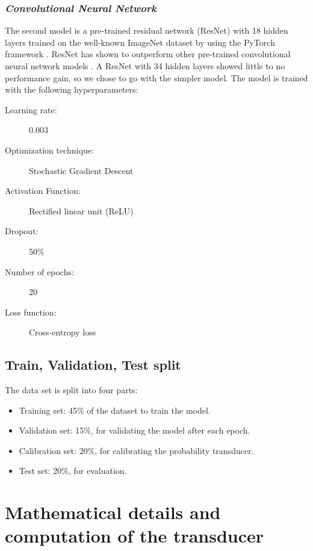 \documentclass[\ifafour a4paper,12pt,\else a5paper,10pt,\fi%
onecolumn,oneside,article,%
british%
]{memoir}
\theoremstyle{remark}
\theoremstyle{innote}
\renewcommand*{\|}[1][]{\nonscript\:#1\vert\nonscript\:\mathopen{}}
\begin{document}
\subsubsection{\textit{Convolutional Neural Network}} 
The second model is a pre-trained residual network (ResNet) \autocites{heetal2016} with 18 hidden layers trained on the well-known ImageNet dataset  \autocites{russakovskyetal2015} by using the PyTorch framework \autocites{paszkeetal2019}. ResNet has shown to outperform other pre-trained convolutional neural network models \autocites{heetal2016}. A ResNet with 34 hidden layers showed little to no performance gain, so we chose to go with the simpler model. The model is trained with the following hyperparameters:
\medskip

\begin{framed}
  \begin{description}
  \item[Learning rate:] 0.003 
  \item[Optimization technique:] Stochastic Gradient Descent 
  \item[Activation Function:] Rectified linear unit (ReLU) 
  \item[Dropout:] 50\% 
  \item[Number of epochs:] 20 
  \item[Loss function:] Cross-entropy loss
  \end{description}
\end{framed}

\subsection{Train, Validation, Test split}

The data set is split into four parts:
\begin{itemize}
\item Training set: 45\% of the dataset to train the model.
\item Validation set: 15\%, for validating the model after each epoch.
\item Calibration set: 20\%, for calibrating the probability transducer.
\item Test set: 20\%, for evaluation.
\end{itemize}

\bigskip

\section{Mathematical details and computation of the transducer}
\label{sec:maths_transducer}
\end{document}
